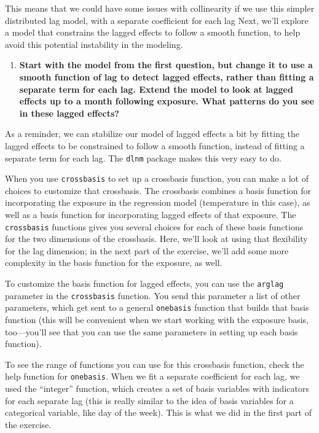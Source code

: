\documentclass[
]{book}
\providecommand{\tightlist}{%
  \setlength{\itemsep}{0pt}\setlength{\parskip}{0pt}}
\begin{document}
This means that we could have some issues with collinearity if we
use this simpler distributed lag model, with a separate coefficient for each lag
Next, we'll explore a model that constrains the lagged effects to follow a smooth
function, to help avoid this potential instability in the modeling.

\begin{enumerate}
\def\labelenumi{\arabic{enumi}.}
\setcounter{enumi}{1}
\tightlist
\item
  \textbf{Start with the model from the first question, but change it to use a smooth
  function of lag to detect lagged effects, rather than fitting a separate term
  for each lag. Extend the model to look at lagged effects up to a month following
  exposure. What patterns do you see in these lagged effects?}
\end{enumerate}

As a reminder, we can stabilize our model of lagged effects a bit by fitting the
lagged effects to be constrained to follow a smooth function, instead of fitting a separate
term for each lag. The \texttt{dlnm} package makes this very easy to do.

When you use \texttt{crossbasis} to set up a crossbasis function, you can make a lot of choices
to customize that crossbasis. The crossbasis combines a basis function for incorporating
the exposure in the regression model (temperature in this case), as well as a basis function
for incorporating lagged effects of that exposure. The \texttt{crossbasis} functions gives you
several choices for each of these basis functions for the two dimensions of the
crossbasis. Here, we'll look at using that flexibility for the lag dimension; in the next
part of the exercise, we'll add some more complexity in the basis function for the
exposure, as well.

To customize the basis function for lagged effects, you can use the \texttt{arglag} parameter
in the \texttt{crossbasis} function. You send this parameter a list of other parameters, which
get sent to a general \texttt{onebasis} function that builds that basis function (this will
be convenient when we start working with the exposure basis, too---you'll see that you
can use the same parameters in setting up each basis function).

To see the range of functions you can use for this crossbasis function, check the help
function for \texttt{onebasis}. When we fit a separate coefficient for each lag, we used the
``integer'' function, which creates a set of basis variables with indicators for each
separate lag (this is really similar to the idea of basis variables for a categorical
variable, like day of the week). This is what we did in the first part of the exercise.
\end{document}
